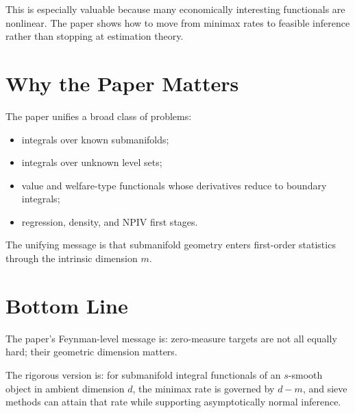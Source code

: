 \documentclass[11pt]{article}
\begin{document}
This is especially valuable because many economically interesting functionals are nonlinear. The paper shows how to move from minimax rates to feasible inference rather than stopping at estimation theory.

\section{Why the Paper Matters}

The paper unifies a broad class of problems:
\begin{itemize}
\item integrals over known submanifolds;
\item integrals over unknown level sets;
\item value and welfare-type functionals whose derivatives reduce to boundary integrals;
\item regression, density, and NPIV first stages.
\end{itemize}

The unifying message is that submanifold geometry enters first-order statistics through the intrinsic dimension $m$.

\section{Bottom Line}

The paper's Feynman-level message is: zero-measure targets are not all equally hard; their geometric dimension matters.

The rigorous version is: for submanifold integral functionals of an $s$-smooth object in ambient dimension $d$, the minimax rate is governed by $d-m$, and sieve methods can attain that rate while supporting asymptotically normal inference.
\end{document}

